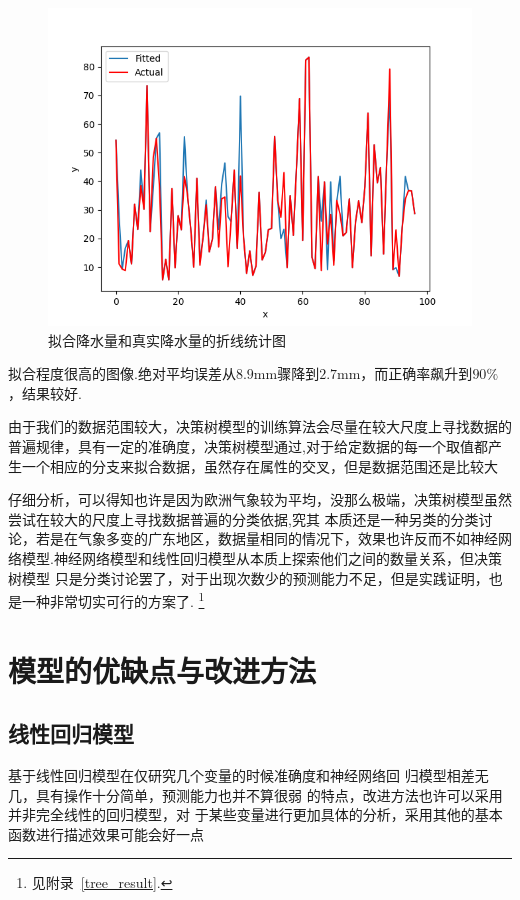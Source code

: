 \documentclass[UTF8, a4paper]{ctexart}
\begin{document}
\begin{figure}[h!]
	\centering
	\includegraphics[scale=0.3]{very_success.png}
	\caption{拟合降水量和真实降水量的折线统计图}\label{pic10}
\end{figure}

拟合程度很高的图像.绝对平均误差从$8.9$\si{\milli\meter}骤降到$2.7$\si{\milli\meter}，而正确率飙升到$90\%$，结果较好.

由于我们的数据范围较大，决策树模型的训练算法会尽量在较大尺度上寻找数据的普遍规律，具有一定的准确度，决策树模型通过,对于给定数据的每一个取值都产生一个相应的分支来拟合数据，虽然存在属性的交叉，但是数据范围还是比较大

仔细分析，可以得知也许是因为欧洲气象较为平均，没那么极端，决策树模型虽然尝试在较大的尺度上寻找数据普遍的分类依据,究其
本质还是一种另类的分类讨论，若是在气象多变的广东地区，数据量相同的情况下，效果也许反而不如神经网
络模型.神经网络模型和线性回归模型从本质上探索他们之间的数量关系，但决策树模型
只是分类讨论罢了，对于出现次数少的预测能力不足，但是实践证明，也是一种非常切实可行的方案了.
\footnote{见附录~\textcolor{red}{\ref{tree_result}}.}


\section{模型的优缺点与改进方法}

\subsection{线性回归模型}
基于线性回归模型在仅研究几个变量的时候准确度和神经网络回
归模型相差无几，具有操作十分简单，预测能力也并不算很弱
的特点，改进方法也许可以采用并非完全线性的回归模型，对
于某些变量进行更加具体的分析，采用其他的基本函数进行描述效果可能会好一点
\end{document}
